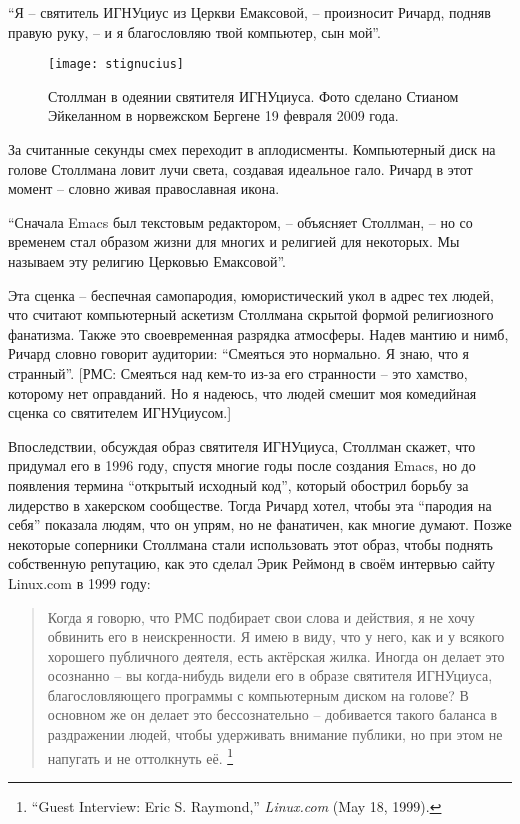 \enquote{Я -- святитель ИГНУциус из Церкви Емаксовой, -- произносит Ричард, подняв правую руку, -- и я благословляю твой компьютер, сын мой}.

\begin{figure}[ht] \centering
  \texttt{[image: stignucius]}
  \caption{Столлман в одеянии святителя ИГНУциуса. Фото сделано Стианом Эйкеланном в норвежском Бергене 19 февраля 2009 года.}
\end{figure}

За считанные секунды смех переходит в аплодисменты. Компьютерный диск на голове Столлмана ловит лучи света, создавая идеальное гало. Ричард в этот момент -- словно живая православная икона.

\enquote{Сначала Emacs был текстовым редактором, -- объясняет Столлман, -- но со временем стал образом жизни для многих и религией для некоторых. Мы называем эту религию Церковью Емаксовой}.

Эта сценка -- беспечная самопародия, юмористический укол в адрес тех людей, что считают компьютерный аскетизм Столлмана скрытой формой религиозного фанатизма. Также это своевременная разрядка атмосферы. Надев мантию и нимб, Ричард словно говорит аудитории: \enquote{Смеяться это нормально. Я знаю, что я странный}.  [РМС: Смеяться над кем-то из-за его странности -- это хамство, которому нет оправданий. Но я надеюсь, что людей смешит моя комедийная сценка со святителем ИГНУциусом.]

Впоследствии, обсуждая образ святителя ИГНУциуса, Столлман скажет, что придумал его в 1996 году, спустя многие годы после создания Emacs, но до появления термина \enquote{открытый исходный код}, который обострил борьбу за лидерство в хакерском сообществе. Тогда Ричард хотел, чтобы эта \enquote{пародия на себя} показала людям, что он упрям, но не фанатичен, как многие думают. Позже некоторые соперники Столлмана стали использовать этот образ, чтобы поднять собственную репутацию, как это сделал Эрик Реймонд в своём интервью сайту Linux.com в 1999 году:

\begin{quote}
Когда я говорю, что РМС подбирает свои слова и действия, я не хочу обвинить его в неискренности. Я имею в виду, что у него, как и у всякого хорошего публичного деятеля, есть актёрская жилка. Иногда он делает это осознанно -- вы когда-нибудь видели его в образе святителя ИГНУциуса, благословляющего программы с компьютерным диском на голове? В основном же он делает это бессознательно -- добивается такого баланса в раздражении людей, чтобы удерживать внимание публики, но при этом не напугать и не оттолкнуть её. \footnote{\enquote{Guest Interview: Eric S. Raymond,} \textit{Linux.com} (May 18, 1999).}
\end{quote}

